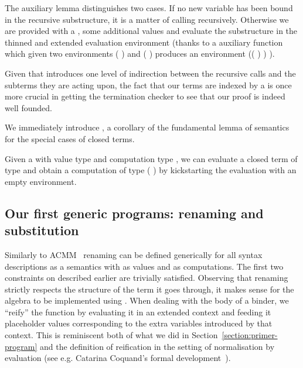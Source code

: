 \begin{center}
\end{center}

The auxiliary lemma  distinguishes two cases. If no new
variable has been bound in the recursive substructure, it is
a matter of calling \semfun{} recursively. Otherwise we are provided
with a , some additional values and evaluate the
substructure in the thinned and extended evaluation environment
(thanks to a auxiliary function \AF{\_>>\_} which given two environments
{( )  } and {( )  }
produces an environment {(( \AF{++} ) )  )}.

\begin{center}
\end{center}

Given that  introduces one level of indirection between the
recursive calls and the subterms they are acting upon, the fact
that our terms are indexed by a  is once more crucial in
getting the termination checker to see that our proof is indeed
well founded.

We immediately introduce , a corollary of the fundamental lemma of
semantics for the special cases of closed terms.
\begin{center}
\end{center}
Given a  with value type  and computation type ,
we can evaluate a closed term of type  and obtain a computation of
type {(  \AIC{[]})} by kickstarting the evaluation with an
empty environment.


\subsection{Our first generic programs: renaming and substitution}%
\label{section:renandsub}

Similarly to ACMM~\citeyear{allais2017type} renaming can be defined generically
for all syntax descriptions as a semantics with  as values and  as
computations. The first two constraints on  described earlier are trivially
satisfied. Observing that renaming strictly respects the structure of the term it
goes through, it makes sense for the algebra to be implemented using .
When dealing with the body of a binder, we ``reify'' the  function by
evaluating it in an extended context and feeding it placeholder values corresponding to
the extra variables introduced by that context. This is reminiscent both of what we
did in Section~\ref{section:primer-program} and the definition of reification in
the setting of normalisation by evaluation
(see e.g. Catarina Coquand's formal development~\citeyear{coquand2002formalised}).


